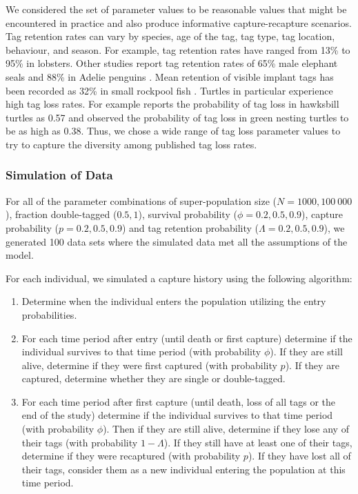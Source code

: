 \documentclass[]{article}
\begin{document}
We considered the set of parameter values to be reasonable values that might be encountered in practice and also produce informative capture-recapture scenarios.  Tag retention rates can vary by species, age of the tag, tag type, tag location, behaviour, and season.  For example, tag retention rates have ranged from 13\% \citep{Fogarty:1980} to 95\% \citep{Gonzalez:2012} in lobsters.  Other studies report tag retention rates of 65\% male elephant seals \citep{Pistorius:2000} and 88\% in Adelie penguins \citep{Ainley:1980}.  Mean retention of visible implant tags has been recorded as 32\% in small rockpool fish \citep{Griffiths:2002}. Turtles in particular experience high tag loss rates.  For example \cite{Bellini:2001} reports the probability of tag loss in hawksbill turtles as 0.57 and    \cite{Bjorndal:1996} observed the probability of tag loss  in green nesting turtles to be as high as 0.38.   Thus, we chose a wide range of tag loss parameter values to try to capture the diversity among published tag loss rates.

\subsubsection{Simulation of Data}\label{simulation-of-data}

For all of the parameter combinations of super-population size
(\(N=1 000, 100 \ 000\)), fraction double-tagged (\(0.5, 1\)), survival
probability (\(\phi=0.2,0.5,0.9\)), capture probability
(\(p=0.2,0.5,0.9\)) and tag retention probability
(\(\Lambda=0.2,0.5,0.9\)), we generated 100 data sets where the
simulated data met all the assumptions of the model.

For each individual, we simulated a capture history using the following
algorithm:

\begin{enumerate}
\def\labelenumi{\arabic{enumi}.}
\item
  Determine when the individual enters the population utilizing the
  entry probabilities.
\item
  For each time period after entry (until death or first capture) 
  determine if the individual survives to that time period (with
  probability \(\phi\)). If they are still alive, determine if they were
  first captured (with probability \(p\)). If they are captured,
  determine whether they are single or double-tagged.
\item
  For each time period after first capture (until death, loss of all
  tags or the end of the study) determine if the individual survives to
  that time period (with probability \(\phi\)). Then if they are still
  alive, determine if they lose any of their tags (with probability
  \(1-\Lambda\)). If they still have at least one of their tags,
  determine if they were recaptured (with probability \(p\)). If they
  have lost all of their tags, consider them as a new individual
  entering the population at this time period.
\end{enumerate}
\end{document}

